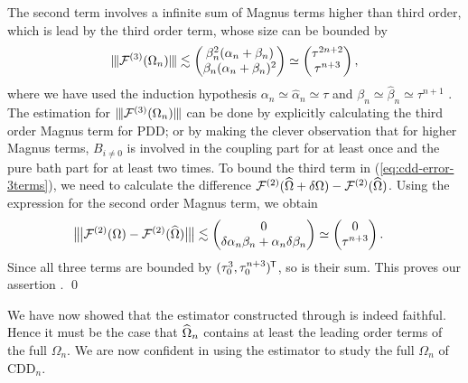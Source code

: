 \documentclass[pra,reprint,superscriptaddress]{revtex4-2}
\begin{document}
The second term involves a infinite sum of Magnus terms higher than third order, which is lead by the third order term, whose 
size can be bounded by 
\begin{equation*}
\opnorm{\cF\up{3}(\Omega_n)}\lesssim
\begin{pmatrix}
\beta_{n}^2 (\alpha_{n}+\beta_{n}) \\
\beta_{n} (\alpha_{n}+\beta_{n})^2
\end{pmatrix}
\simeq \begin{pmatrix}
\tau^{2n+2}\\
\tau^{n+3}
\end{pmatrix},
\end{equation*}
where we have used the induction hypothesis 
$\alpha_{n}\simeq\widehat\alpha_{n}\simeq\tau$ and 
$\beta_{n}\simeq\widehat\beta_{n}\simeq \tau^{n+1}$ .
The estimation for $\opnorm{\cF\up{3}(\Omega_n)}$ can be done by explicitly calculating the third order Magnus term for PDD; or by making  the clever observation that for higher Magnus terms, 
$B_{i\neq0}$ is involved in the coupling part for at least once and 
 the pure bath part for at least two times.  
To bound the third term in (\ref{eq:cdd-error-3terms}), we need to calculate the difference $\mathcal{F}^{(2)}(\widehat{\Omega}+\delta\Omega) - \mathcal{F}^{(2)}(\widehat{\Omega})$.
Using the expression for the second order Magnus term, we obtain
\begin{equation*}
\begin{split}
&\opnorm[\big]{\cF\up{2}(\Omega) - \cF\up{2}(\Ohat)} 
\lesssim\begin{pmatrix}
    0\\
    \delta\alpha_{n} \beta_{n} +\alpha_{n} \delta\beta_{n}
\end{pmatrix}\simeq
\begin{pmatrix}
    0\\
    \tau^{n+3}
\end{pmatrix}.
\end{split}
\end{equation*}
Since all three terms are bounded by $(\tau_0^3, \tau_0^{n+3})^{\mkern-1.5mu\mathsf{T}}$, so is their sum. This proves our assertion . \qed

\smallskip

We have now showed that the estimator constructed through 
 is indeed faithful.
Hence it must be the case that $\widehat{\Omega}_n$ contains at least the leading order terms of the full $\Omega_n$. We are now confident in using the estimator  to study the full $\Omega_{n}$ of $\mathrm{CDD}_n$. 








\appendix
\end{document}
